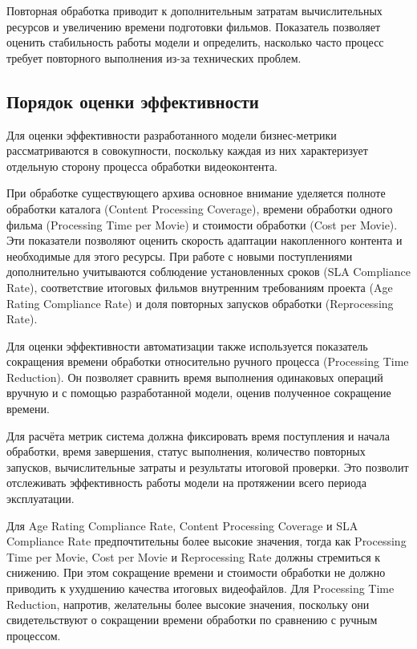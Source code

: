 \documentclass[a4paper,14pt]{extarticle}
\begin{document}
    Повторная обработка приводит к дополнительным затратам вычислительных ресурсов и увеличению времени подготовки фильмов. 
    Показатель позволяет оценить стабильность работы модели и определить, насколько часто процесс требует повторного выполнения из-за технических проблем.

    \subsection{Порядок оценки эффективности}
    Для оценки эффективности разработанного модели бизнес-метрики рассматриваются в совокупности, поскольку каждая из них характеризует отдельную сторону процесса обработки видеоконтента.

    При обработке существующего архива основное внимание уделяется полноте обработки каталога (Content Processing Coverage), времени обработки одного фильма (Processing Time per Movie) и стоимости обработки (Cost per Movie). 
    Эти показатели позволяют оценить скорость адаптации накопленного контента и необходимые для этого ресурсы. 
    При работе с новыми поступлениями дополнительно учитываются соблюдение установленных сроков (SLA Compliance Rate), соответствие итоговых фильмов внутренним требованиям проекта (Age Rating Compliance Rate) и доля повторных запусков обработки (Reprocessing Rate).

    Для оценки эффективности автоматизации также используется показатель сокращения времени обработки относительно ручного процесса (Processing Time Reduction). 
    Он позволяет сравнить время выполнения одинаковых операций вручную и с помощью разработанной модели, оценив полученное сокращение времени.

    Для расчёта метрик система должна фиксировать время поступления и начала обработки, время завершения, статус выполнения, количество повторных запусков, вычислительные затраты и результаты итоговой проверки. 
    Это позволит отслеживать эффективность работы модели на протяжении всего периода эксплуатации.

    Для Age Rating Compliance Rate, Content Processing Coverage и SLA Compliance Rate предпочтительны более высокие значения, тогда как Processing Time per Movie, Cost per Movie и Reprocessing Rate должны стремиться к снижению. 
    При этом сокращение времени и стоимости обработки не должно приводить к ухудшению качества итоговых видеофайлов. 
    Для Processing Time Reduction, напротив, желательны более высокие значения, поскольку они свидетельствуют о сокращении времени обработки по сравнению с ручным процессом.
\end{document}
